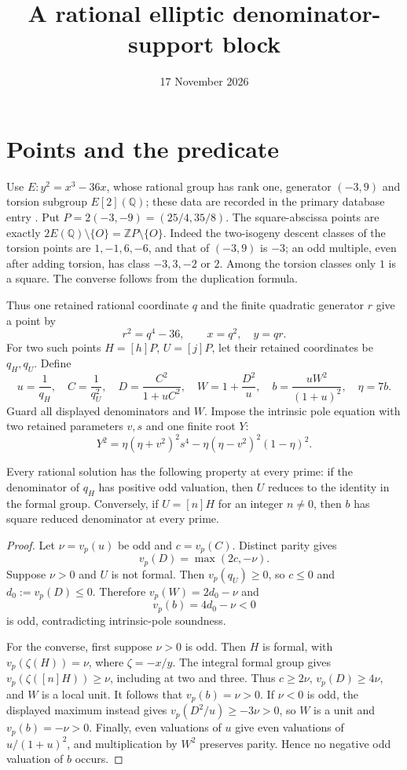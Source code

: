 \documentclass[11pt]{article}
\title{A rational elliptic denominator-support block}
\author{}\date{17 November 2026}
\newcommand{\Q}{\mathbb Q}\newcommand{\Z}{\mathbb Z}
\begin{document}
\maketitle

\section{Points and the predicate}

Use $E:y^2=x^3-36x$, whose rational group has rank one, generator
$(-3,9)$ and torsion subgroup $E[2](\Q)$; these data are recorded
in the primary database entry \cite{LMFDB}. Put
$P=2(-3,-9)=(25/4,35/8)$. The square-abscissa points are exactly
$2E(\Q)\setminus\{O\}=\Z P\setminus\{O\}$.
Indeed the two-isogeny descent classes of the torsion points are
$1,-1,6,-6$, and that of $(-3,9)$ is $-3$; an odd multiple,
even after adding torsion, has class $-3,3,-2$ or $2$.
Among the torsion classes only $1$ is a square. The converse follows
from the duplication formula.

Thus one retained rational coordinate $q$ and the finite quadratic
generator $r$ give a point by
\[
                 r^2=q^4-36,\qquad x=q^2,\quad y=qr.
\]
For two such points $H=[h]P$, $U=[j]P$, let their retained
coordinates be $q_H,q_U$. Define
\[
 u=\frac1{q_H},\quad C=\frac1{q_U^2},\quad
 D=\frac{C^2}{1+uC^2},\quad W=1+\frac{D^2}{u},\quad
 b=\frac{uW^2}{(1+u)^2},\quad\eta=7b.
\]
Guard all displayed denominators and $W$. Impose the intrinsic pole
equation with two retained parameters $v,s$ and one finite root $Y$:
\[
 Y^2=\eta(\eta+v^2)^2s^4
          -\eta(\eta-v^2)^2(1-\eta)^2.
\]

\begin{lemma}
Every rational solution has the following property at every prime:
if the denominator of $q_H$ has positive odd valuation, then $U$
reduces to the identity in the formal group.
Conversely, if $U=[n]H$ for an integer $n\ne0$, then $b$ has
square reduced denominator at every prime.
\end{lemma}
\begin{proof}
Let $\nu=v_p(u)$ be odd and $c=v_p(C)$. Distinct parity gives
\[
                    v_p(D)=\max(2c,-\nu).
\]
Suppose $\nu>0$ and $U$ is not formal. Then $v_p(q_U)\ge0$,
so $c\le0$ and $d_0:=v_p(D)\le0$. Therefore
$v_p(W)=2d_0-\nu$ and
\[
                     v_p(b)=4d_0-\nu<0
\]
is odd, contradicting intrinsic-pole soundness.

For the converse, first suppose $\nu>0$ is odd. Then $H$ is
formal, with $v_p(\zeta(H))=\nu$, where $\zeta=-x/y$.
The integral formal group gives
$v_p(\zeta([n]H))\ge\nu$, including at two and three.
Thus $c\ge2\nu$, $v_p(D)\ge4\nu$, and $W$ is a local unit.
It follows that $v_p(b)=\nu>0$. If $\nu<0$ is odd, the displayed
maximum instead gives $v_p(D^2/u)\ge-3\nu>0$, so $W$ is a unit
and $v_p(b)=-\nu>0$. Finally, even valuations of $u$ give even
valuations of $u/(1+u)^2$, and multiplication by $W^2$ preserves
parity. Hence no negative odd valuation of $b$ occurs.
\end{proof}
\end{document}

